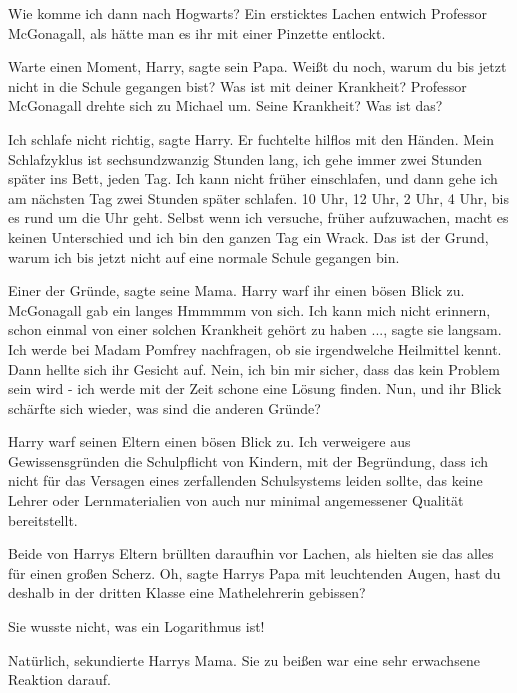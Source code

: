 \glqq{}Wie komme ich dann nach Hogwarts?\grqq{} Ein ersticktes Lachen entwich
Professor McGonagall, als hätte man es ihr mit einer Pinzette entlockt.

\glqq{}Warte einen Moment, Harry\grqq{}, sagte sein Papa. \glqq{}Weißt du noch,
warum du bis jetzt nicht in die Schule gegangen bist? Was ist mit deiner
Krankheit?\grqq{} Professor McGonagall drehte sich zu Michael um. \glqq{}Seine
Krankheit? Was ist das?\grqq{}

\glqq{}Ich schlafe nicht richtig\grqq{}, sagte Harry. Er fuchtelte hilflos mit
den Händen. \glqq{}Mein Schlafzyklus ist sechsundzwanzig Stunden lang, ich gehe
immer zwei Stunden später ins Bett, jeden Tag. Ich kann nicht früher
einschlafen, und dann gehe ich am nächsten Tag zwei Stunden später schlafen. 10
Uhr, 12 Uhr, 2 Uhr, 4 Uhr, bis es rund um die Uhr geht. Selbst wenn ich
versuche, früher aufzuwachen, macht es keinen Unterschied und ich bin den ganzen
Tag ein Wrack. Das ist der Grund, warum ich bis jetzt nicht auf eine normale
Schule gegangen bin.\grqq{}

\glqq{}Einer der Gründe\grqq{}, sagte seine Mama. Harry warf ihr einen bösen
Blick zu. McGonagall gab ein langes Hmmmmm von sich. \glqq{}Ich kann mich nicht
erinnern, schon einmal von einer solchen Krankheit gehört zu haben ...\grqq{},
sagte sie langsam. \glqq{}Ich werde bei Madam Pomfrey nachfragen, ob sie
irgendwelche Heilmittel kennt.\grqq{} Dann hellte sich ihr Gesicht auf. \glqq{}
Nein, ich bin mir sicher, dass das kein Problem sein wird - ich werde mit der
Zeit schone eine Lösung finden. Nun\grqq{}, und ihr Blick schärfte sich wieder,
\glqq{}was sind die anderen Gründe?\grqq{}

Harry warf seinen Eltern einen bösen Blick zu. \glqq{}Ich verweigere aus
Gewissensgründen die Schulpflicht von Kindern, mit der Begründung, dass ich
nicht für das Versagen eines zerfallenden Schulsystems leiden sollte, das keine
Lehrer oder Lernmaterialien von auch nur minimal angemessener Qualität
bereitstellt.\grqq{}

Beide von Harrys Eltern brüllten daraufhin vor Lachen, als hielten sie das alles
für einen großen Scherz. \glqq{}Oh\grqq{}, sagte Harrys Papa mit leuchtenden
Augen, \glqq{}hast du deshalb in der dritten Klasse eine Mathelehrerin
gebissen?\grqq{}

\glqq{}Sie wusste nicht, was ein Logarithmus ist!\grqq{}

\glqq{}Natürlich\grqq{}, sekundierte Harrys Mama. \glqq{}Sie zu beißen war
eine sehr erwachsene Reaktion darauf.\grqq{}

